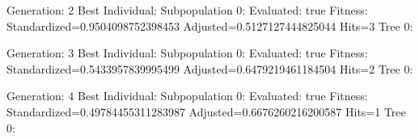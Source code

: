 \documentclass[]{article}
\begin{document}
\begin{landscape}
Generation: 2
Best Individual:
Subpopulation 0:
Evaluated: true
Fitness: Standardized=0.9504098752398453 Adjusted=0.5127127444825044 Hits=3
Tree 0:
\begin{bundle}{\gpbox{+}}\chunk{\begin{bundle}{\gpbox{+}}\chunk{\begin{bundle}{\gpbox{+}}\chunk{\gpbox{}}\chunk{\gpbox{}}\end{bundle}}\chunk{\begin{bundle}{\gpbox{*}}\chunk{\gpbox{}}\chunk{\gpbox{}}\end{bundle}}\end{bundle}}\chunk{\begin{bundle}{\gpbox{+}}\chunk{\gpbox{}}\chunk{\gpbox{}}\end{bundle}}\end{bundle}

Generation: 3
Best Individual:
Subpopulation 0:
Evaluated: true
Fitness: Standardized=0.5433957839995499 Adjusted=0.6479219461184504 Hits=2
Tree 0:
\begin{bundle}{\gpbox{-}}\chunk{\begin{bundle}{\gpbox{+}}\chunk{\begin{bundle}{\gpbox{+}}\chunk{\gpbox{}}\chunk{\gpbox{}}\end{bundle}}\chunk{\begin{bundle}{\gpbox{+}}\chunk{\gpbox{}}\chunk{\gpbox{}}\end{bundle}}\end{bundle}}\end{bundle}

Generation: 4
Best Individual:
Subpopulation 0:
Evaluated: true
Fitness: Standardized=0.49784455311283987 Adjusted=0.6676260216200587 Hits=1
Tree 0:
\begin{bundle}{\gpbox{+}}\chunk{\begin{bundle}{\gpbox{+}}\chunk{\gpbox{}}\chunk{\gpbox{}}\end{bundle}}\chunk{\begin{bundle}{\gpbox{+}}\chunk{\gpbox{}}\chunk{\gpbox{}}\end{bundle}}\end{bundle}


\end{landscape}
\end{document}
